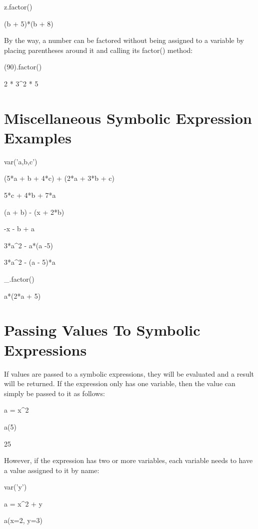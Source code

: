 \documentclass[12pt,oneside]{book}
\begin{document}
z.factor()

{\textbar}

(b + 5)*(b + 8)

By the way, a number can be factored without being assigned to a variable by placing parentheses around it and calling its factor() method: 

(90).factor()

{\textbar}

2 * 3\^{}2 * 5

\section[Miscellaneous Symbolic Expression Examples]{ Miscellaneous Symbolic Expression Examples} 

var('a,b,c')


(5*a + b + 4*c) + (2*a + 3*b + c)

{\textbar}

5*c + 4*b + 7*a

(a + b) {}- (x + 2*b)

{\textbar}

{}-x {}- b + a

3*a\^{}2 {}- a*(a {}-5)

{\textbar}

3*a\^{}2 {}- (a {}- 5)*a

\_.factor()

{\textbar}

a*(2*a + 5)

\section[Passing Values To Symbolic Expressions]{Passing Values To Symbolic Expressions}

If values are passed to a symbolic expressions, they will be evaluated and a result will be returned. If the expression only has one variable, then the value can simply be passed to it as follows: 

a = x\^{}2

a(5)

{\textbar}

25

However, if the expression has two or more variables, each variable needs to have a value assigned to it by name: 

var('y')

a = x\^{}2 + y

a(x=2, y=3)

{\textbar}
\end{document}
